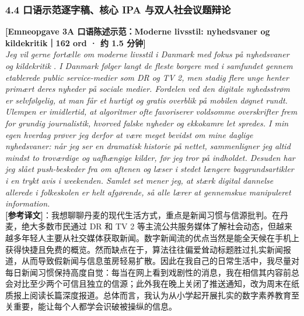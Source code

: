 \subsubsection*{4.4 口语示范逐字稿、核心 IPA 与双人社会议题辩论}

\begin{transbox}
\small
\textbf{\color{NCDNavy}[Emneopgave 3A 口语陈述示范：Moderne livsstil: nyhedsvaner og kildekritik｜162 ord · 约 1.5 分钟]}\\
\textit{Jeg vil gerne fortælle om moderne livsstil i Danmark med fokus på nyhedsvaner og kildekritik . I Danmark følger langt de fleste borgere med i samfundet gennem etablerede public service-medier som DR og TV 2, men stadig flere unge henter primært deres nyheder på sociale medier. Fordelen ved den digitale nyhedsstrøm er selvfølgelig, at man får et hurtigt og gratis overblik  på mobilen døgnet rundt. Ulempen er imidlertid, at algoritmer ofte favoriserer voldsomme overskrifter frem for grundig journalistik, hvorved falske nyheder og ekkokamre  let spredes. I min egen hverdag prøver jeg derfor at være meget bevidst om mine daglige nyhedsvaner: når jeg ser en dramatisk historie på nettet, sammenligner jeg altid mindst to troværdige  og uafhængige kilder, før jeg tror på indholdet. Desuden har jeg slået push-beskeder fra om aftenen og læser i stedet længere baggrundsartikler i en trykt avis i weekenden. Samlet set mener jeg, at stærk digital dannelse allerede i folkeskolen er helt afgørende, så alle lærer at gennemskue manipuleret information.}\\[4pt]
\textbf{\color{NCDTeal}[参考译文]}：我想聊聊丹麦的现代生活方式，重点是新闻习惯与信源批判。在丹麦，绝大多数市民通过 DR 和 TV 2 等主流公共服务媒体了解社会动态，但越来越多年轻人主要从社交媒体获取新闻。数字新闻流的优点当然是能全天候在手机上获得快捷且免费的概览。然而缺点在于，算法往往偏爱耸动标题胜过扎实新闻报道，从而导致假新闻与信息茧房轻易扩散。因此在我自己的日常生活中，我尽量对每日新闻习惯保持高度自觉：每当在网上看到戏剧性的消息，我在相信其内容前总会对比至少两个可信且独立的信源；此外我在晚上关闭了推送通知，改为周末在纸质报上阅读长篇深度报道。总体而言，我认为从小学起开展扎实的数字素养教育至关重要，能让每个人都学会识破被操纵的信息。
\end{transbox}

